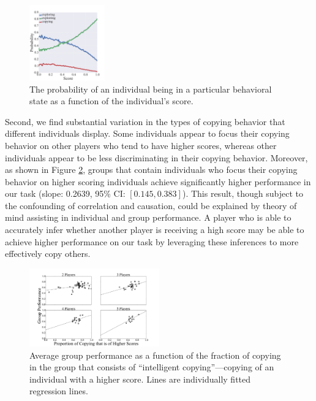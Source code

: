 \documentclass[12pt,letterpaper]{article}
\begin{document}
\begin{figure}
  \centering
  \includegraphics[width=0.29\textwidth]{./figures/states}
  \caption{The probability of an individual being in a particular
    behavioral state as a function of the individual's score.}
  \label{fig:states}
\end{figure}

Second, we find substantial variation in the types of copying behavior
that different individuals display.  Some individuals appear to focus
their copying behavior on other players who tend to have higher
scores, whereas other individuals appear to be less discriminating in
their copying behavior.  Moreover, as shown in Figure
\ref{fig:proportion}, groups that contain individuals who focus their
copying behavior on higher scoring individuals achieve significantly
higher performance in our task (slope: 0.2639, 95\% CI: $[0.145,
  0.383]$).  This result, though subject to the confounding of
correlation and causation, could be explained by theory of mind
assisting in individual and group performance.  A player who is able
to accurately infer whether another player is receiving a high score
may be able to achieve higher performance on our task by leveraging
these inferences to more effectively copy others.

\begin{figure}
  \centering
  \includegraphics[width=0.5\textwidth]{./figures/copy-true-proportion}
  \caption{Average group performance as a function of the fraction of
    copying in the group that consists of ``intelligent
    copying''---copying of an individual with a higher score.  Lines
    are individually fitted regression lines.}
  \label{fig:proportion}
\end{figure}
\end{document}
